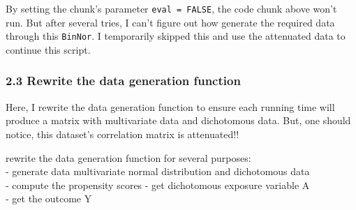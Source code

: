 \documentclass[
]{article}
\begin{document}
By setting the chunk's parameter \texttt{eval\ =\ FALSE}, the code chunk
above won't run. But after several tries, I can't figure out how
generate the required data through this \texttt{BinNor}. I temporarily
skipped this and use the attenuated data to continue this script.

\hypertarget{rewrite-the-data-generation-function}{%
\subsubsection{2.3 Rewrite the data generation
function}\label{rewrite-the-data-generation-function}}

Here, I rewrite the data generation function to ensure each running time
will produce a matrix with multivariate data and dichotomous data. But,
one should notice, this dataset's correlation matrix is attenuated!!

rewrite the data generation function for several purposes:\\
- generate data multivariate normal distribution and dichotomous data\\
- compute the propensity scores - get dichotomous exposure variable A\\
- get the outcome Y
\end{document}
